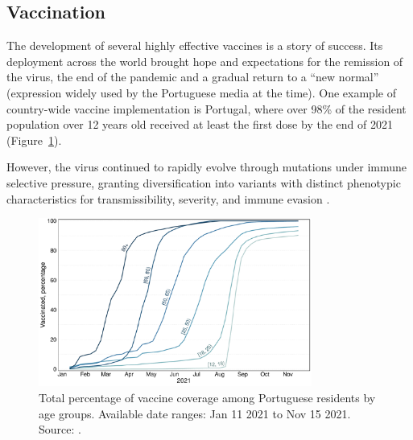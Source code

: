 
\subsection{Vaccination}

The development of several highly effective \sars vaccines is a story of success.
Its deployment across the world brought hope and expectations for the remission of the virus, the end of the pandemic and a gradual return to a ``new normal'' (expression widely used by the Portuguese media at the time).
One example of country-wide vaccine implementation is Portugal, where over 98\% of the resident population over 12 years old received at least the first dose by the end of 2021 (Figure~\ref{fig:intro-vaccination-percentages}).

However, the virus continued to rapidly evolve through mutations under immune selective pressure, granting diversification into variants with distinct phenotypic characteristics for transmissibility, severity, and immune evasion \citep{markov2023EvolutionSARSCoV2}.

\begin{figure}[h]
    \centering
    \includegraphics[width=0.8\textwidth]{chapter/introduction/figures/2021-vaccination-percent-agegroup.pdf}
    \caption[Total percentage of vaccine coverage among Portuguese residents by age groups]{Total percentage of vaccine coverage among Portuguese residents by age groups. Available date ranges: Jan 11 2021 to Nov 15 2021. Source: \citet{nationaldirectorateofhealth2021COVID19Vaccination}.}
    \label{fig:intro-vaccination-percentages}
\end{figure}

